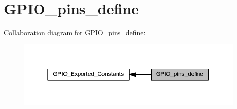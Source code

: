 \hypertarget{group___g_p_i_o__pins__define}{}\section{G\+P\+I\+O\+\_\+pins\+\_\+define}
\label{group___g_p_i_o__pins__define}
Collaboration diagram for G\+P\+I\+O\+\_\+pins\+\_\+define\+:\nopagebreak
\begin{figure}[H]
\begin{center}
\leavevmode
\includegraphics[width=345pt]{group___g_p_i_o__pins__define}
\end{center}
\end{figure}

